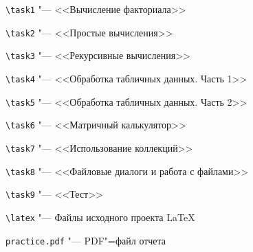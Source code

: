\documentclass[bachelor, och, pract]{SCWorks}
\begin{document}
\begin{description}
	\item \verb|\task1| "--- <<Вычисление факториала>>
	\item \verb|\task2| "--- <<Простые вычисления>>
	\item \verb|\task3| "--- <<Рекурсивные вычисления>>
	\item \verb|\task4| "--- <<Обработка табличных данных. Часть 1>>
	\item \verb|\task5| "--- <<Обработка табличных данных. Часть 2>>
	\item \verb|\task6| "--- <<Матричный калькулятор>>
	\item \verb|\task7| "--- <<Использование коллекций>>
	\item \verb|\task8| "--- <<Файловые диалоги и работа с файлами>>
	\item \verb|\task9| "--- <<Тест>>
	\item \verb|\latex| "--- Файлы исходного проекта \LaTeX
	\item \verb|practice.pdf| "--- PDF"=файл отчета
\end{description}
%

%

\end{document}
